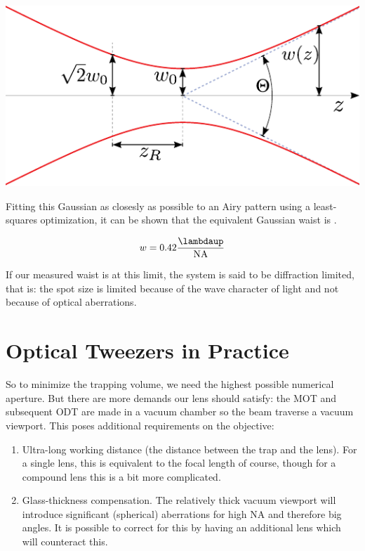 \begin{mdframed}
    \vspace*{3mm}
    \centering
        \includegraphics[width=0.5\linewidth]{figures/GaussianBeam.pdf}
        \label{fig:GaussianBeam}
\end{mdframed}

Fitting this Gaussian as closesly as possible to an Airy pattern using a least-squares optimization, it can be shown that the equivalent Gaussian waist is \cite{Zhang2007}.

\begin{equation}\label{eq:GaussianAiryFit}
    w = 0.42 \frac{\lambdaup}{\text{NA}}
\end{equation}
 
If our measured waist is at this limit, the system is said to be diffraction limited, that is: the spot size is limited because of the wave character of light and not because of optical aberrations. 

\section{Optical Tweezers in Practice}\label{sec:TweezersPractice}

So to minimize the trapping volume, we need the highest possible numerical aperture. But there are more demands our lens should satisfy: the \ac{MOT} and subsequent \ac{ODT} are made in a vacuum chamber so the beam traverse a vacuum viewport. This poses additional requirements on the objective:

\begin{enumerate}
    \item Ultra-long working distance (the distance between the trap and the lens). For a single lens, this is equivalent to the focal length of course, though for a compound lens this is a bit more complicated. 
    
    \item Glass-thickness compensation. The relatively thick vacuum viewport will introduce significant (spherical) aberrations for high NA and therefore big angles. It is possible to correct for this by having an additional lens which will counteract this.
\end{enumerate}

